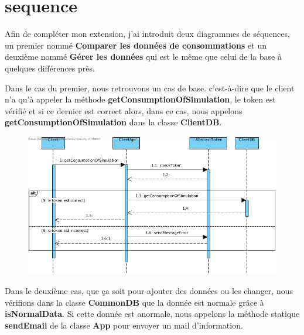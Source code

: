 \section{sequence}

\begin{flushleft}
Afin de compléter mon extension, j'ai introduit deux diagrammes de séquences, un premier nommé \textbf{Comparer les données de consommations} et un deuxième nommé \textbf{Gérer les données} qui est le même que celui de la base à quelques différences près.
\end{flushleft}

\begin{flushleft}
Dans le cas du premier, nous retrouvons un cas de base. c'est-à-dire que le client n'a qu'à appeler la méthode \textbf{getConsumptionOfSimulation}, le token est vérifié et si ce dernier est correct alors, dans ce cas, nous appelons \textbf{getConsumptionOfSimulation} dans la classe \textbf{ClientDB}.
\end{flushleft}

\begin{figure}[h]
\centering
\includegraphics[width=1.3\textwidth]{extension-adrien/Sequence/img/comparer.png}
\end{figure}

\begin{flushleft}
Dans le deuxième cas, que ça soit pour ajouter des données ou les changer, nous vérifions dans la classe \textbf{CommonDB} que la donnée est normale grâce à \textbf{isNormalData}. Si cette donnée est anormale, nous appelons la méthode statique \textbf{sendEmail} de la classe \textbf{App} pour envoyer un mail d'information.
\end{flushleft}


